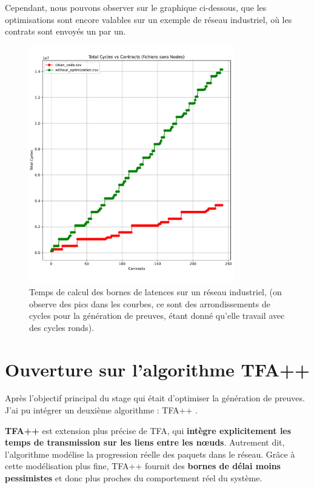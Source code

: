 \documentclass[12pt]{report}
\begin{document}
\bigskip

Cependant, nous pouvons observer sur le graphique ci-dessous, que les optimisations sont 
encore valables sur un exemple de réseau industriel, où les contrats sont envoyés 
un par un.

\begin{figure}[H]
    \centering
    \includegraphics[width=0.8\textwidth]{benchmark_indusnet.pdf}
    \caption{Temps de calcul des bornes de latences sur un réseau industriel, 
    (on observe des pics dans
    les courbes, ce sont des arrondissements de cycles pour la génération de preuves, étant donné qu'elle travail avec des cycles ronds).}
\end{figure}



\chapter{Ouverture sur l'algorithme TFA++}

Après l'objectif principal du stage qui était d'optimiser la génération de preuves.
J'ai pu intégrer un deuxième algorithme : TFA++ \cite{mifdaoui:hal-01690096}.

\bigskip

\textbf{TFA++} est extension plus précise de TFA, qui 
\textbf{intègre explicitement les temps de transmission sur les 
liens entre les nœuds}. Autrement dit, l'algorithme modélise la 
progression réelle des paquets dans le réseau. Grâce à cette modélisation plus fine, 
TFA++ fournit des \textbf{bornes de délai moins pessimistes} et 
donc plus proches du comportement réel du système.
\end{document}
